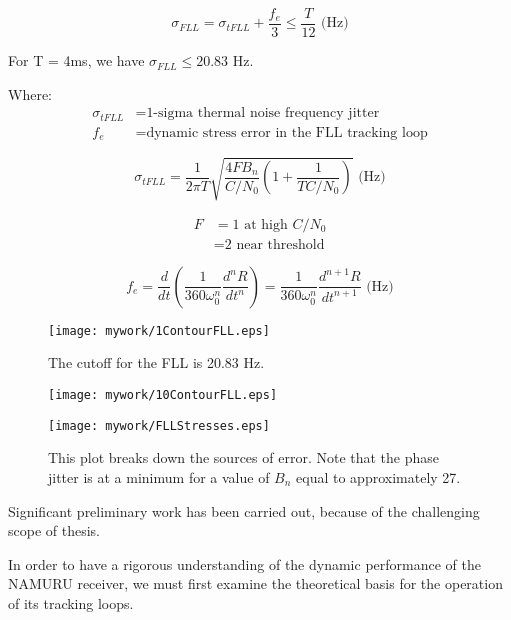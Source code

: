 \begin{equation}
\sigma_{FLL} =  \sigma_{tFLL} + \frac{f_e}{3} \leq \frac{T}{12} \text{ (Hz)}
\end{equation}

For T = 4ms, we have $\sigma_{FLL} \leq 20.83$ Hz.


Where:
\begin{align*}
\sigma_{tFLL} &= \text{1-sigma thermal noise frequency jitter}\\
f_e &= \text{dynamic stress error in the FLL tracking loop}
\end{align*}


\begin{equation}
\sigma_{tFLL} = \frac{1}{2 \pi T} \sqrt{ \frac{4FB_n}{C/N_0}(1 + \frac{1}{TC/N_0})} \text{ (Hz)}
\end{equation}

\begin{align*}
F &= \text{1 at high } C/N_0\\
  &= \text{2 near threshold}
\end{align*}


\begin{equation}
f_e = \frac{d}{dt}(\frac{1}{360 \omega^n_0}\frac{d^nR}{dt^n}) = \frac{1}{360\omega^n_0} \frac{d^{n+1}R}{dt^{n+1}} \text{ (Hz)}
\end{equation}


\begin{figure}[!htb] 
    \centering
    \texttt{[image: mywork/1ContourFLL.eps]} 
    \caption{The cutoff for the FLL is 20.83 Hz.}
\end{figure}

\begin{figure}[!htb] 
    \centering
    \texttt{[image: mywork/10ContourFLL.eps]} 
    \caption{}
\end{figure}



\begin{figure}[!htb] 
    \centering
    \texttt{[image: mywork/FLLStresses.eps]} 
    \caption{This plot breaks down the sources of error. Note that the phase jitter is at a minimum for a value of $B_n$ equal to approximately 27.}
\end{figure}




Significant preliminary work has been carried out, because of the challenging scope of thesis. 

In order to have a rigorous understanding of the dynamic performance of the \ac{NAMURU} receiver, we must first examine the theoretical basis for the operation of its tracking loops. 

